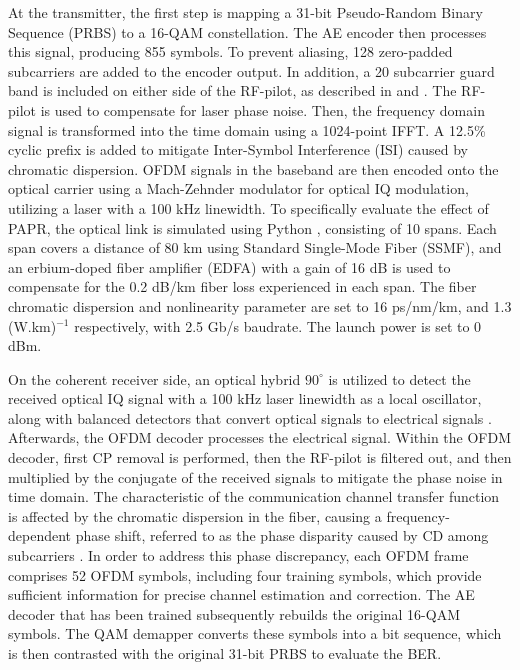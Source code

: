 \documentclass[conference]{IEEEtran}
\begin{document}
At the transmitter, the first step is mapping a 31-bit Pseudo-Random Binary Sequence (PRBS) to a 16-QAM constellation. The AE encoder then processes this signal, producing 855 symbols. To prevent aliasing, 128 zero-padded subcarriers are added to the encoder output. In addition, a 20 subcarrier guard band is included on either side of the RF-pilot, as described in \cite{b18} and \cite{b19}. The RF-pilot is used to compensate for laser phase noise. Then, the frequency domain signal is transformed into the time domain using a 1024-point IFFT. A 12.5\% cyclic prefix is added to mitigate Inter-Symbol Interference (ISI) caused by chromatic dispersion. OFDM signals in the baseband are then encoded onto the optical carrier using a Mach-Zehnder modulator for optical IQ modulation, utilizing a laser with a 100 kHz linewidth. To specifically evaluate the effect of PAPR, the optical link is simulated using Python \cite{b20}, consisting of 10 spans. Each span covers a distance of 80 km using Standard Single-Mode Fiber (SSMF), and an erbium-doped fiber amplifier (EDFA) with a gain of 16 dB is used to compensate for the 0.2 dB/km fiber loss experienced in each span. The fiber chromatic dispersion and nonlinearity parameter are set to 16 ps/nm/km, and 1.3 (W.km)$^{-1}$ respectively, with 2.5 Gb/s baudrate. The launch power is set to 0 dBm.

On the coherent receiver side, an optical hybrid $90^{\circ}$ is utilized to detect the received optical IQ signal with a 100 kHz laser linewidth as a local oscillator, along with balanced detectors that convert optical signals to electrical signals \cite{b20}. Afterwards, the OFDM decoder processes the electrical signal. Within the OFDM decoder, first CP removal is performed, then the RF-pilot is filtered out, and then multiplied by the conjugate of the received signals to mitigate the phase noise in time domain. The characteristic of the communication channel transfer function is affected by the chromatic dispersion in the fiber, causing a frequency-dependent phase shift, referred to as the phase disparity caused by CD among subcarriers \cite{b21}. In order to address this phase discrepancy, each OFDM frame comprises 52 OFDM symbols, including four training symbols, which provide sufficient information for precise channel estimation and correction. The AE decoder that has been trained subsequently rebuilds the original 16-QAM symbols. The QAM demapper converts these symbols into a bit sequence, which is then contrasted with the original 31-bit PRBS to evaluate the BER.
\end{document}
